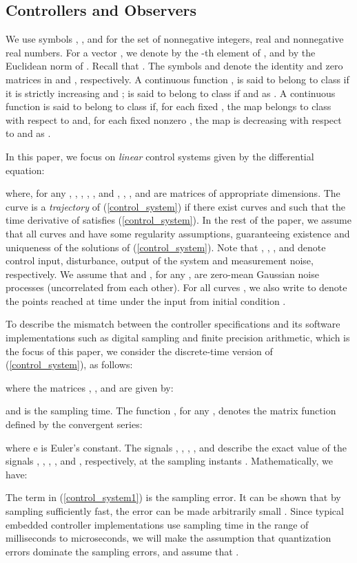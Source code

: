\documentclass{amsart}
\numberwithin{equation}{section}
\begin{document}
\subsection{Controllers and Observers}
We use symbols , , and  for the set of nonnegative integers, real and nonnegative real numbers.
For a vector , we denote by  the {-th} element of , 
and by  the Euclidean norm of .
Recall that \mbox{}. The symbols  and  denote the identity and zero matrices in  and , respectively. A continuous function \mbox{}, is said to belong to class  
if it is strictly increasing and \mbox{};  is said to belong to class  if \mbox{} 
and \mbox{} as . 
A continuous function \mbox{} is said to belong to class  if, 
for each fixed , the map  belongs to class  with respect to 
and, for each fixed nonzero , the map  is decreasing with respect to  and  as \mbox{}. 

In this paper, we focus on \textit{linear} control systems given by the differential equation:

where, for any , , , , , and , , , and  are matrices of appropriate dimensions. 
The curve  is a \textit{trajectory} of (\ref{control_system}) if there exist curves  and  such that the time derivative of  satisfies (\ref{control_system}). In the rest of the paper, we assume that all curves  and  have some regularity assumptions, guaranteeing existence and uniqueness of the solutions of (\ref{control_system}). Note that , , , and  denote control input, disturbance, output of the system and measurement noise, respectively. We assume that  and , for any , are zero-mean Gaussian noise processes (uncorrelated from each other). For all curves , we also write  to denote the points reached at time  under the input  from initial condition . 

To describe the mismatch between the controller specifications and its software implementations 
such as digital sampling and finite precision arithmetic, which is the focus of this paper, 
we consider the discrete-time version of (\ref{control_system}), as follows:

where the matrices , , and  are given by:

and  is the sampling time. The function , for any , denotes the matrix function defined by the convergent series:

where \textsf{e} is Euler's constant. The signals , , , , and  describe the exact value of the signals , , , , and , respectively, at the sampling instants . Mathematically, we have:

The term  in (\ref{control_system1}) is the sampling error. It can be shown that by sampling sufficiently fast, the error  can be made arbitrarily small \cite{chen}. 
Since typical embedded controller implementations use sampling time in the range of milliseconds to microseconds, we will 
make the assumption that quantization errors dominate the sampling errors, and 
assume that . 
 
\end{document}
